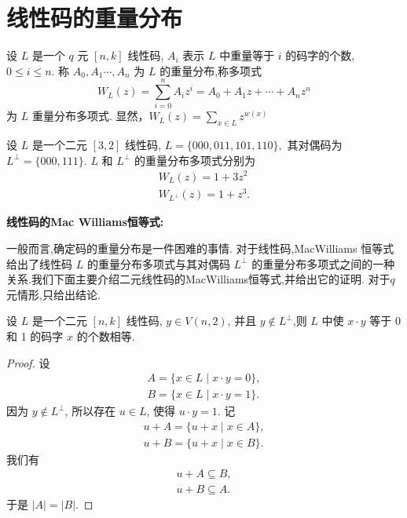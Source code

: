 \section{线性码的重量分布}
\begin{definition}
    设 $ L $ 是一个 $ q $ 元 $ [n, k] $ 线性码, $ A_{i} $ 表示 $ L $ 中重量等于 $ i $ 的码字的个数, $ 0 \leq i \leq n $.
称 $ A_{0}, A_{1} \cdots, A_{n} $ 为 $ L $ 的重量分布,称多项式
$$
W_{L}(z)=\sum_{i=0}^{n} A_{i} z^{i}=A_{0}+A_{1} z+\cdots+A_{n} z^{n}
$$
为 $ L $ 重量分布多项式. 显然，$W_{L}(z)=\sum\limits_{x\in L}z^{w(x)}$
\end{definition}
\begin{example}
 设 $ L $ 是一个二元 $ [3,2] $ 线性码, $L=\{000,011,101,110\},$ 其对偶码为 $ L^{\perp}=\{000,111\} $.
$ L $ 和 $ L ^{\perp} $ 的重量分布多项式分别为
$$
\begin{array}{l}
W_{L}(z)=1+3 z^{2} \\
W_{L^{\perp}}(z)=1+z^{3} .
\end{array}
$$
\end{example}

\textbf{线性码的Mac Williams恒等式:}

一般而言,确定码的重量分布是一件困难的事情. 对于线性码,MacWilliams 恒等式给出了线性码 $ L $ 的重量分布多项式与其对偶码 $ L ^\perp $ 的重量分布多项式之间的一种关系.我们下面主要介绍二元线性码的MacWilliams恒等式,并给出它的证明. 对于$q$元情形,只给出结论.

\begin{lemma}\label{lemma7.4.1}
    设 $ L $ 是一个二元 $ [n, k] $ 线性码, $ y \in V(n, 2) $, 并且 $ y \notin L^{\perp} $,则 $ L $ 中使 $ x \cdot y $ 等于 0 和 1 的码字 $ x $ 的个数相等.
\end{lemma}

\begin{proof}
 设
$$
\begin{array}{l}
A=\{x \in L \mid x \cdot y=0\}, \\
B=\{x \in L \mid x \cdot y=1\} .
\end{array}
$$
因为 $ y \notin L^{\perp} $, 所以存在 $ u \in L $, 使得 $ u \cdot y=1 $. 记
$$
\begin{array}{l}
u+A=\{u+x \mid x \in A\}, \\
u+B=\{u+x \mid x \in B\} .
\end{array}
$$
我们有
$$
\begin{array}{l}
u+A \subseteq B, \\
u+B \subseteq A .
\end{array}
$$
于是 $ |A|=|B| $.
\end{proof}

